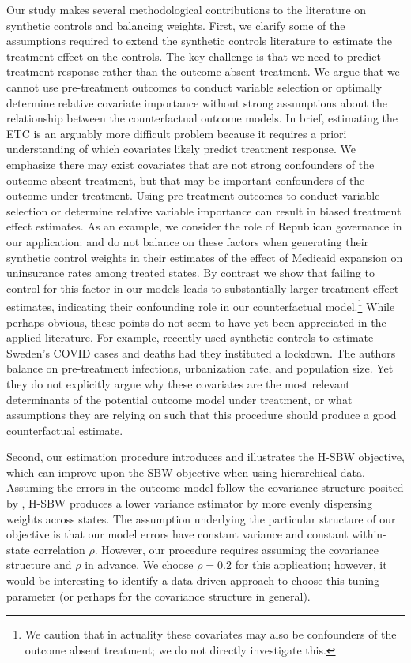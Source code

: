Our study makes several methodological contributions to the literature on synthetic controls and balancing weights. First, we clarify some of the assumptions required to extend the synthetic controls literature to estimate the treatment effect on the controls. The key challenge is that we need to predict treatment response rather than the outcome absent treatment. We argue that we cannot use pre-treatment outcomes to conduct variable selection or optimally determine relative covariate importance without strong assumptions about the relationship between the counterfactual outcome models. In brief, estimating the ETC is an arguably more difficult problem because it requires a priori understanding of which covariates likely predict treatment response. We emphasize there may exist covariates that are not strong confounders of the outcome absent treatment, but that may be important confounders of the outcome under treatment. Using pre-treatment outcomes to conduct variable selection or determine relative variable importance can result in biased treatment effect estimates. As an example, we consider the role of Republican governance in our application: \cite{kaestner2017effects} and \cite{courtemanche2017early} do not balance on these factors when generating their synthetic control weights in their estimates of the effect of Medicaid expansion on uninsurance rates among treated states. By contrast we show that failing to control for this factor in our models leads to substantially larger treatment effect estimates, indicating their confounding role in our counterfactual model.\footnote{We caution that in actuality these covariates may also be confounders of the outcome absent treatment; we do not directly investigate this.} While perhaps obvious, these points do not seem to have yet been appreciated in the applied literature. For example, \cite{born2020lockdowns} recently used synthetic controls to estimate Sweden's COVID cases and deaths had they instituted a lockdown. The authors balance on pre-treatment infections, urbanization rate, and population size. Yet they do not explicitly argue why these covariates are the most relevant determinants of the potential outcome model under treatment, or what assumptions they are relying on such that this procedure should produce a good counterfactual estimate.

Second, our estimation procedure introduces and illustrates the H-SBW objective, which can improve upon the SBW objective when using hierarchical data. Assuming the errors in the outcome model follow the covariance structure posited by \cite{kloek1981ols}, H-SBW produces a lower variance estimator by more evenly dispersing weights across states. The assumption underlying the particular structure of our objective is that our model errors have constant variance and constant within-state correlation $\rho$. However, our procedure requires assuming the covariance structure and $\rho$ in advance. We choose $\rho = 0.2$ for this application; however, it would be interesting to identify a data-driven approach to choose this tuning parameter (or perhaps for the covariance structure in general). 

